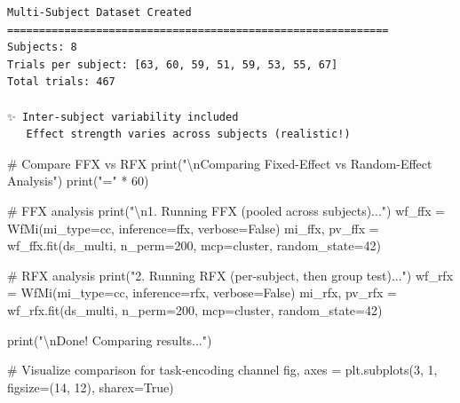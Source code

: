 \documentclass[
  11pt,
  letterpaper,
  oneside,
  openany]{book}
\newenvironment{Shaded}{\begin{snugshade}}{\end{snugshade}}
\newcommand{\BuiltInTok}[1]{\textcolor[rgb]{0.00,0.23,0.31}{#1}}
\newcommand{\CharTok}[1]{\textcolor[rgb]{0.13,0.47,0.30}{#1}}
\newcommand{\CommentTok}[1]{\textcolor[rgb]{0.37,0.37,0.37}{#1}}
\newcommand{\DecValTok}[1]{\textcolor[rgb]{0.68,0.00,0.00}{#1}}
\newcommand{\NormalTok}[1]{\textcolor[rgb]{0.00,0.23,0.31}{#1}}
\newcommand{\OperatorTok}[1]{\textcolor[rgb]{0.37,0.37,0.37}{#1}}
\newcommand{\StringTok}[1]{\textcolor[rgb]{0.13,0.47,0.30}{#1}}
\newcommand{\VariableTok}[1]{\textcolor[rgb]{0.07,0.07,0.07}{#1}}
\begin{document}
\begin{verbatim}
Multi-Subject Dataset Created
============================================================
Subjects: 8
Trials per subject: [63, 60, 59, 51, 59, 53, 55, 67]
Total trials: 467

✨ Inter-subject variability included
   Effect strength varies across subjects (realistic!)
\end{verbatim}

\begin{Shaded}
\begin{Highlighting}[]
\CommentTok{\# Compare FFX vs RFX}
\BuiltInTok{print}\NormalTok{(}\StringTok{"}\CharTok{\textbackslash{}n}\StringTok{Comparing Fixed{-}Effect vs Random{-}Effect Analysis"}\NormalTok{)}
\BuiltInTok{print}\NormalTok{(}\StringTok{"="} \OperatorTok{*} \DecValTok{60}\NormalTok{)}

\CommentTok{\# FFX analysis}
\BuiltInTok{print}\NormalTok{(}\StringTok{"}\CharTok{\textbackslash{}n}\StringTok{1. Running FFX (pooled across subjects)..."}\NormalTok{)}
\NormalTok{wf\_ffx }\OperatorTok{=}\NormalTok{ WfMi(mi\_type}\OperatorTok{=}\StringTok{\textquotesingle{}cc\textquotesingle{}}\NormalTok{, inference}\OperatorTok{=}\StringTok{\textquotesingle{}ffx\textquotesingle{}}\NormalTok{, verbose}\OperatorTok{=}\VariableTok{False}\NormalTok{)}
\NormalTok{mi\_ffx, pv\_ffx }\OperatorTok{=}\NormalTok{ wf\_ffx.fit(ds\_multi, n\_perm}\OperatorTok{=}\DecValTok{200}\NormalTok{, mcp}\OperatorTok{=}\StringTok{\textquotesingle{}cluster\textquotesingle{}}\NormalTok{, random\_state}\OperatorTok{=}\DecValTok{42}\NormalTok{)}

\CommentTok{\# RFX analysis  }
\BuiltInTok{print}\NormalTok{(}\StringTok{"2. Running RFX (per{-}subject, then group test)..."}\NormalTok{)}
\NormalTok{wf\_rfx }\OperatorTok{=}\NormalTok{ WfMi(mi\_type}\OperatorTok{=}\StringTok{\textquotesingle{}cc\textquotesingle{}}\NormalTok{, inference}\OperatorTok{=}\StringTok{\textquotesingle{}rfx\textquotesingle{}}\NormalTok{, verbose}\OperatorTok{=}\VariableTok{False}\NormalTok{)}
\NormalTok{mi\_rfx, pv\_rfx }\OperatorTok{=}\NormalTok{ wf\_rfx.fit(ds\_multi, n\_perm}\OperatorTok{=}\DecValTok{200}\NormalTok{, mcp}\OperatorTok{=}\StringTok{\textquotesingle{}cluster\textquotesingle{}}\NormalTok{, random\_state}\OperatorTok{=}\DecValTok{42}\NormalTok{)}

\BuiltInTok{print}\NormalTok{(}\StringTok{"}\CharTok{\textbackslash{}n}\StringTok{Done! Comparing results..."}\NormalTok{)}

\CommentTok{\# Visualize comparison for task{-}encoding channel}
\NormalTok{fig, axes }\OperatorTok{=}\NormalTok{ plt.subplots(}\DecValTok{3}\NormalTok{, }\DecValTok{1}\NormalTok{, figsize}\OperatorTok{=}\NormalTok{(}\DecValTok{14}\NormalTok{, }\DecValTok{12}\NormalTok{), sharex}\OperatorTok{=}\VariableTok{True}\NormalTok{)}


\end{Highlighting}
\end{Shaded}
\end{document}
